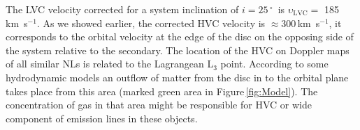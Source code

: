 \documentclass[fleqn,usenatbib]{mnras}
\def\grad{$^\circ$}
\begin{document}
 The LVC velocity corrected for a system inclination of  $i=25$\,\grad\  is $\upsilon_{\mathrm{LVC}} =$ 185\,km~s$^{-1}$. 
As we showed earlier, the corrected HVC velocity is $\approx300$\,km~s$^{-1}$,   it corresponds to the orbital velocity at the edge of the disc on the opposing side of the system relative to the secondary.
The location of the HVC on Doppler maps of all similar NLs is related to the Lagrangean  L$_3$ point. According to some hydrodynamic models
\citep[]{2007ARep...51..836S, 2017MNRAS.467.2934L}
an outflow of matter from the disc  in to the orbital plane takes place from this area (marked green area in
Figure\,\ref{fig:Model}). The concentration of gas in that area might be responsible for HVC or wide component of emission lines in these
objects.
\end{document}
